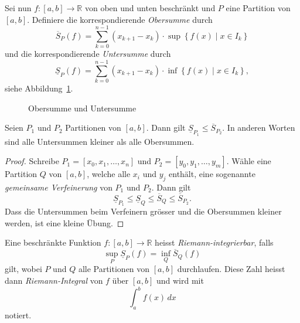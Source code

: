 \documentclass[../main.tex]{subfiles}
\begin{document}
Sei nun $f \colon [a, b] \to \mathbb{R}$ von oben und
unten beschränkt und $P$ eine Partition von $[a, b]$.
Definiere die korrespondierende \emph{Obersumme} durch
\[
  \overline S_P(f)
  = \sum_{k = 0}^{n - 1} (x_{k + 1} - x_k)
  \cdot \sup \left\{f(x) \mid x \in I_k \right\}
\]
und die korrespondierende \emph{Untersumme} durch
\[
  \underline S_P(f)
  = \sum_{k = 0}^{n - 1} (x_{k + 1} - x_k)
  \cdot \inf \left\{f(x) \mid x \in I_k \right\},
\]
siehe Abbildung~\ref{fig:riemann}.

\begin{figure}[htb] 
  \centering
  \begin{minipage}{0.50\textwidth}
    \centering

    
  \end{minipage}%
  \begin{minipage}{0.50\textwidth}
    \centering

    
  \end{minipage}%
  \caption{Obersumme und Untersumme}%
  \label{fig:riemann}
\end{figure}

\begin{lemma*}
  Seien $P_1$ und $P_2$ Partitionen
  von $[a, b]$. Dann gilt
  $\underline S_{P_1} \leq \overline S_{P_2}$.
  In anderen Worten sind alle Untersummen
  kleiner als alle Obersummen.
\end{lemma*}

\begin{proof}
  Schreibe
  $P_1 = [x_0, x_1, \dots, x_n]$ 
  und
  $P_2 = [y_0, y_1, \dots, y_m]$.
  Wähle eine Partition $Q$ von
  $[a,b]$, welche alle $x_i$ und
  $y_j$ enthält, eine sogenannte
  \emph{gemeinsame Verfeinerung}
  von $P_1$ und $P_2$.
  Dann gilt
  \[
    \underline S_{P_1} \leq \underline S_Q
    \leq \overline S_Q
    \leq \overline S_{P_2}.
  \]
  Dass die Untersummen beim Verfeinern
  grösser und die Obersummen kleiner
  werden, ist eine kleine Übung.
\end{proof}

\begin{definition}
  Eine beschränkte Funktion
  $f \colon [a, b] \to \mathbb{R}$ heisst
  \emph{Riemann-integrierbar}, falls
  \[
    \sup_{P} \underline S_P(f) = \inf_{Q} \overline S_Q(f)
  \]
  gilt,
  wobei $P$ und $Q$ alle Partitionen von
  $[a, b]$ durchlaufen.
  Diese Zahl heisst dann \emph{Riemann-Integral}
  von $f$ über $[a,b]$ und wird
  mit
  \[
    \int_{a}^{b} f(x) \, dx
  \]
  notiert.
\end{definition}
\end{document}
